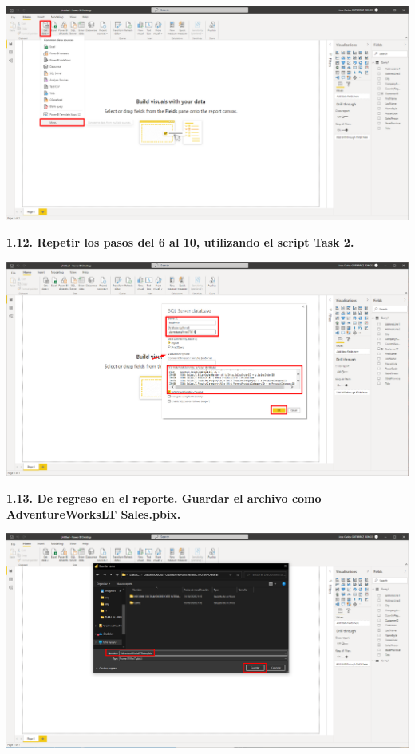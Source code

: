 \documentclass{article}
\begin{document}
    \begin{center}
		\includegraphics[width=14cm]{./images/11} 
	\end{center}

\textbf{1.12. Repetir los pasos del 6 al 10, utilizando el script \textbf{Task 2}.}

    \begin{center}
		\includegraphics[width=14cm]{./images/12} 
	\end{center}
\newpage
\textbf{1.13. De regreso en el reporte. Guardar el archivo como \textbf{AdventureWorksLT Sales.pbix}.}

    \begin{center}
		\includegraphics[width=14cm]{./images/13} 
	\end{center}
\end{document}
